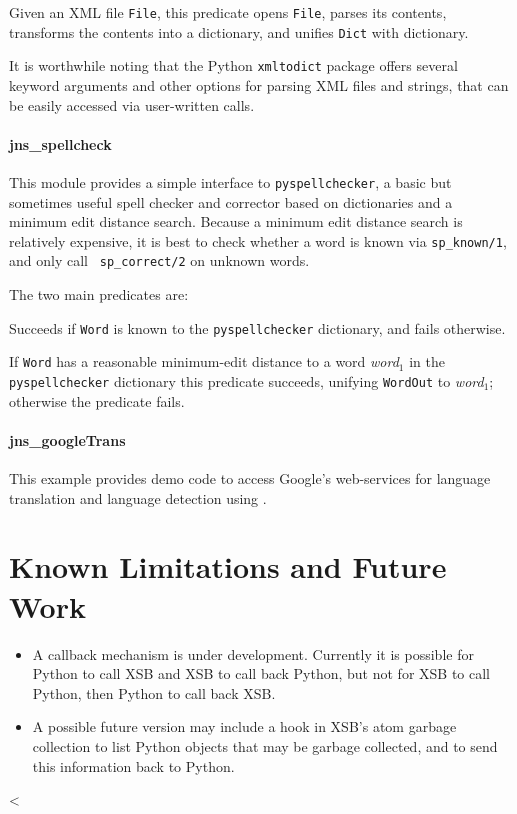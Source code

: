\begin{description}
  
  Given an XML file {\tt File}, this predicate opens {\tt File},
  parses its contents, transforms the contents into a dictionary, and
  unifies {\tt Dict} with dictionary.  
\end{description}

\noindent
It is worthwhile noting that the Python {\tt xmltodict} package offers
several keyword arguments and other options for parsing XML files and
strings, that can be easily accessed via user-written \janus{} calls.

\paragraph{jns\_spellcheck}
This module provides a simple interface to {\tt pyspellchecker}, a
basic but sometimes useful spell checker and corrector based on
dictionaries and a minimum edit distance search.  Because a minimum
edit distance search is relatively expensive, it is best to check
whether a word is known via {\tt sp\_known/1}, and only call {\tt
  sp\_correct/2} on unknown words.

The two main predicates are:
\begin{description}
 Succeeds
  if {\tt Word} is known to the {\tt pyspellchecker} dictionary, and
  fails otherwise.

  If {\tt Word} has a reasonable minimum-edit distance to a word {\em
    word$_1$} in the {\tt pyspellchecker} dictionary this predicate
  succeeds, unifying {\tt WordOut} to {\em word$_1$}; otherwise the
  predicate fails.
\end{description}


\paragraph{jns\_googleTrans}
This example provides demo code to access Google's web-services for
language translation and language detection using \janus .



\section{Known Limitations and Future Work}

\begin{itemize}
\item A callback mechanism is under development.  Currently it is
  possible for Python to call XSB and XSB to call back Python, but not
  for XSB to call Python, then Python to call back XSB.  
\item A possible future version may include a hook in XSB's atom
  garbage collection to list Python objects that may be garbage
  collected, and to send this information back to Python.  
\end{itemize}  

<
